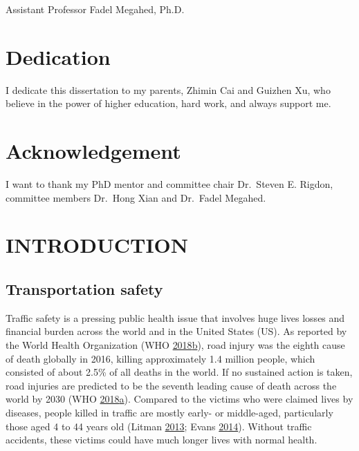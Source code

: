 \documentclass[12pt]{book}
\numberwithin{equation}{chapter}
\begin{document}
\vspace{.3cm}
Assistant Professor Fadel Megahed, Ph.D.
\vspace*{\fill}








\hypertarget{dedication}{%
\chapter*{Dedication}\label{dedication}}

I dedicate this dissertation to my parents, Zhimin Cai and Guizhen Xu, who believe in the power of higher education, hard work, and always support me.

\hypertarget{acknowledgement}{%
\chapter*{Acknowledgement}\label{acknowledgement}}

I want to thank my PhD mentor and committee chair Dr.~Steven E. Rigdon, committee members Dr.~Hong Xian and Dr.~Fadel Megahed.

\cleardoublepage
\tableofcontents

\listoffigures
\listoftables

\mainmatter

\doublespacing

\hypertarget{introduction}{%
\chapter{INTRODUCTION}\label{introduction}}

\hypertarget{transportation-safety}{%
\section{Transportation safety}\label{transportation-safety}}

Traffic safety is a pressing public health issue that involves huge lives losses and financial burden across the world and in the United States (US).
As reported by the World Health Organization (WHO \protect\hyperlink{ref-who2018}{2018}\protect\hyperlink{ref-who2018}{b}), road injury was the eighth cause of death globally in 2016, killing approximately 1.4 million people, which consisted of about 2.5\% of all deaths in the world.
If no sustained action is taken, road injuries are predicted to be the seventh leading cause of death across the world by 2030 (WHO \protect\hyperlink{ref-who2018b}{2018}\protect\hyperlink{ref-who2018b}{a}).
Compared to the victims who were claimed lives by diseases, people killed in traffic are mostly early- or middle-aged, particularly those aged 4 to 44 years old (Litman \protect\hyperlink{ref-litman2013transportation}{2013}; Evans \protect\hyperlink{ref-evans2014traffic}{2014}).
Without traffic accidents, these victims could have much longer lives with normal health.
\end{document}
